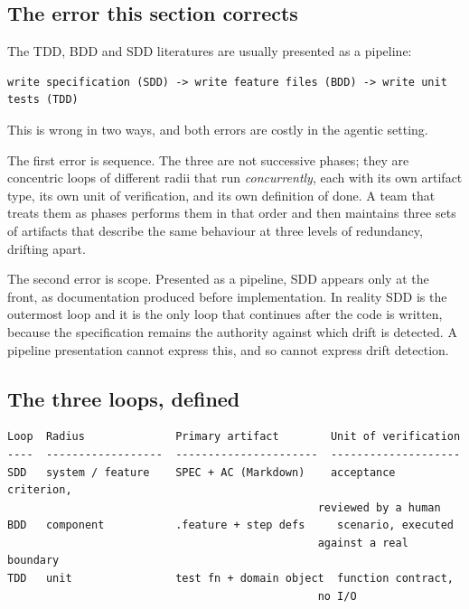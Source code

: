 \documentclass[11pt,a4paper]{article}
\begin{document}
\subsection{The error this section corrects}

The TDD, BDD and SDD literatures are usually presented as a pipeline:

\begin{Verbatim}[fontsize=\footnotesize,breaklines=true,breakanywhere=true,breakautoindent=false,samepage=false]
write specification (SDD) -> write feature files (BDD) -> write unit
tests (TDD)
\end{Verbatim}

This is wrong in two ways, and both errors are costly in the agentic setting.

The first error is sequence. The three are not successive phases; they are concentric loops of different radii that run \emph{concurrently}, each with its own artifact type, its own unit of verification, and its own definition of done. A team that treats them as phases performs them in that order and then maintains three sets of artifacts that describe the same behaviour at three levels of redundancy, drifting apart.

The second error is scope. Presented as a pipeline, SDD appears only at the front, as documentation produced before implementation. In reality SDD is the outermost loop and it is the only loop that continues after the code is written, because the specification remains the authority against which drift is detected. A pipeline presentation cannot express this, and so cannot express drift detection.

\subsection{The three loops, defined}

\begin{Verbatim}[fontsize=\footnotesize,breaklines=true,breakanywhere=true,breakautoindent=false,samepage=false]
Loop  Radius              Primary artifact        Unit of verification
----  ------------------  ----------------------  --------------------
SDD   system / feature    SPEC + AC (Markdown)    acceptance criterion,
                                                reviewed by a human
BDD   component           .feature + step defs     scenario, executed
                                                against a real boundary
TDD   unit                test fn + domain object  function contract,
                                                no I/O
\end{Verbatim}
\end{document}
